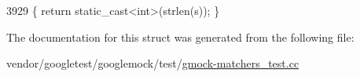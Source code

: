 \begin{DoxyCode}
3929 \{ \textcolor{keywordflow}{return} \textcolor{keyword}{static\_cast<}\textcolor{keywordtype}{int}\textcolor{keyword}{>}(strlen(s)); \}
\end{DoxyCode}


The documentation for this struct was generated from the following file\+:\begin{DoxyCompactItemize}
\item 
vendor/googletest/googlemock/test/\hyperlink{gmock-matchers__test_8cc}{gmock-\/matchers\+\_\+test.\+cc}\end{DoxyCompactItemize}
